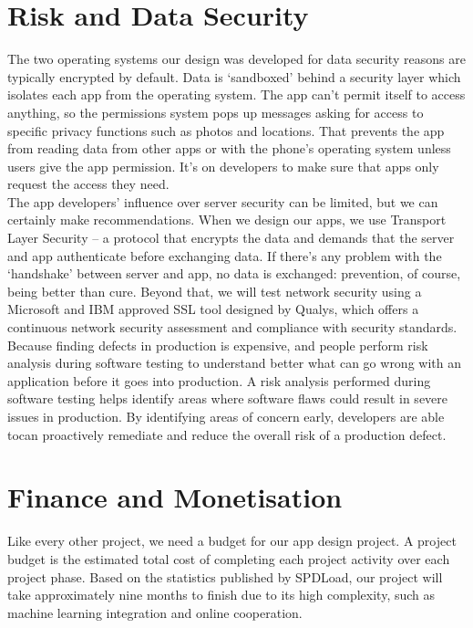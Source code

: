  \section{Risk and Data Security}
The two operating systems our design was developed for data security reasons are typically encrypted by default. Data is ‘sandboxed’ behind a security layer which isolates each app from the operating system. The app can’t permit itself to access anything, so the permissions system pops up messages asking for access to specific privacy functions such as photos and locations. That prevents the app from reading data from other apps or with the phone’s operating system unless users give the app permission. It’s on developers to make sure that apps only request the access they need.
 \\The app developers’ influence over server security can be limited, but we can certainly make recommendations. When we design our apps, we use Transport Layer Security – a protocol that encrypts the data and demands that the server and app authenticate before exchanging data. If there’s any problem with the ‘handshake’ between server and app, no data is exchanged: prevention, of course, being better than cure. Beyond that, we will test network security using a Microsoft and IBM approved SSL tool designed by Qualys, which offers a continuous network security assessment and compliance with security standards.
 \\Because finding defects in production is expensive, and people perform risk analysis during software testing to understand better what can go wrong with an application before it goes into production. A risk analysis performed during software testing helps identify areas where software flaws could result in severe issues in production. By identifying areas of concern early, developers are able tocan proactively remediate and reduce the overall risk of a production defect.

\section{Finance and Monetisation}
Like every other project, we need a budget for our app design project. A project budget is the estimated total cost of completing each project activity over each project phase. Based on the statistics published by SPDLoad, our project will take approximately nine months to finish due to its high complexity, such as machine learning integration and online cooperation.
